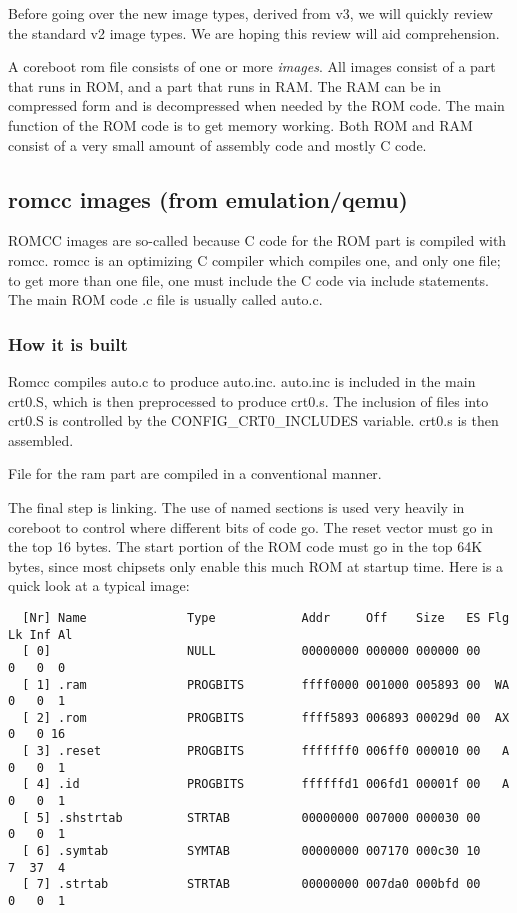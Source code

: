 \documentclass[titlepage,12pt]{article}
\begin{document}
Before going over the new image types, derived from v3, we will quickly review the standard v2 image types. We are hoping this review will
aid comprehension.

A coreboot rom file consists of one or more \textit{images}. All images consist of a part that runs in ROM, and a part that runs in RAM. The RAM can be in  compressed form and is decompressed when needed by the ROM code. The main function of the ROM code is to get memory working. Both ROM and RAM consist of a very small amount of assembly code and mostly C code.

\subsection{romcc images (from emulation/qemu)}
ROMCC images are so-called because C code for the ROM part is compiled with romcc. romcc is an optimizing C compiler which compiles one, and only
one file; to get more than one file, one must include the C code via include statements. The main ROM code .c file is usually called auto.c.
\subsubsection{How it is built}
Romcc compiles auto.c to produce auto.inc. auto.inc is included in the main crt0.S, which is then preprocessed to produce crt0.s. The inclusion of files into crt0.S is controlled by the CONFIG\_CRT0\_INCLUDES variable. crt0.s is then assembled.

File for the ram part are compiled in a conventional manner.

The final step is linking. The use of named sections is used very heavily in coreboot to control where different bits of code go. The reset vector must go in the top 16 bytes. The start portion of the ROM code must go in the top 64K bytes, since most chipsets only enable this much ROM at startup time. Here is a quick look at a typical image:
\begin{verbatim}
  [Nr] Name              Type            Addr     Off    Size   ES Flg Lk Inf Al
  [ 0]                   NULL            00000000 000000 000000 00      0   0  0
  [ 1] .ram              PROGBITS        ffff0000 001000 005893 00  WA  0   0  1
  [ 2] .rom              PROGBITS        ffff5893 006893 00029d 00  AX  0   0 16
  [ 3] .reset            PROGBITS        fffffff0 006ff0 000010 00   A  0   0  1
  [ 4] .id               PROGBITS        ffffffd1 006fd1 00001f 00   A  0   0  1
  [ 5] .shstrtab         STRTAB          00000000 007000 000030 00      0   0  1
  [ 6] .symtab           SYMTAB          00000000 007170 000c30 10      7  37  4
  [ 7] .strtab           STRTAB          00000000 007da0 000bfd 00      0   0  1
\end{verbatim}
\end{document}
